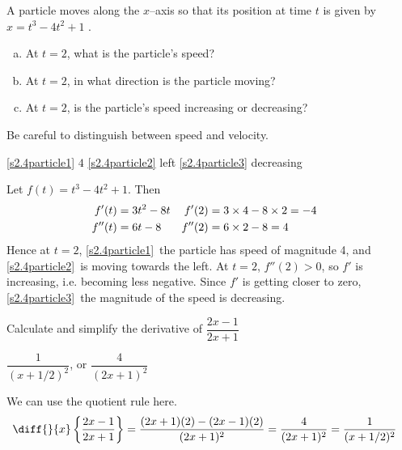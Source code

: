 \begin{Mquestion}[1999H]
A particle moves along the $x$--axis so that its position
 at time $t$ is given by $x=t^3-4t^2+1$ .
\begin{enumerate}[(a)]
\item\label{s2.4particle1}At $t=2$, what is the particle's speed?
\item\label{s2.4particle2}At $t=2$, in what direction is the particle moving?
\item\label{s2.4particle3}At $t=2$, is the particle's speed increasing or decreasing?
\end{enumerate}
\end{Mquestion}
\begin{hint} Be careful to distinguish between speed and velocity.
\end{hint}
\begin{answer}
\eqref{s2.4particle1} $4$\qquad
\eqref{s2.4particle2} left \qquad
\eqref{s2.4particle3} decreasing
\end{answer}
\begin{solution}
Let $f(t)=t^3-4t^2+1$. Then
\begin{align*}
f'(t)&=3t^2-8t & f'(2)&=3\times 4-8\times 2=-4\cr
f''(t)&=6t-8 & f''(2)&=6\times 2-8=4\cr
\end{align*}
Hence at $t=2$, \eqref{s2.4particle1}~the particle has speed of magnitude {4}, and \eqref{s2.4particle2}~is
moving {towards the left}.
At $t=2$, $f''(2)>0$, so $f'$ is increasing, i.e.
becoming less negative. Since $f'$ is getting closer to zero, \eqref{s2.4particle3}~the magnitude of the speed is
{decreasing}.
\end{solution}


\begin{question}[1999H]
Calculate and simplify the derivative of
$\dfrac{2x-1}{2x+1}$
\end{question}
\begin{answer}
$\dfrac{1}{{(x+1/2)}^2}$, or $\dfrac{4}{(2x+1)^2}$
\end{answer}
\begin{solution}
We can use the quotient rule here.
\begin{align*}
\diff{}{x}\left\{\frac{2x-1}{2x+1}\right\}&=\frac{(2x+1)(2)-(2x-1)(2)}{(2x+1)^2}
=\frac{4}{(2x+1)^2}=\frac{1}{(x+1/2)^2}
\end{align*}
\end{solution}




